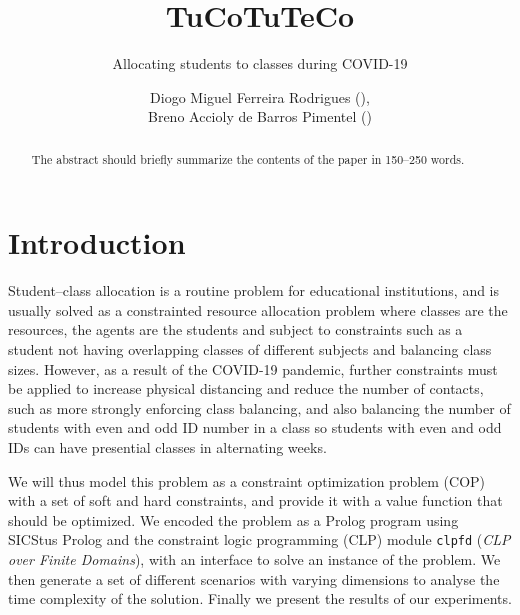\documentclass[runningheads]{llncs}
\begin{document}
\title{TuCoTuTeCo}
\subtitle{Allocating students to classes during COVID-19}
%
%
\author{Diogo Miguel Ferreira Rodrigues (),\\
Breno Accioly de Barros Pimentel ()}


%
\maketitle              %
%
\begin{abstract}
The abstract should briefly summarize the contents of the paper in
150--250 words.

\end{abstract}

\section{Introduction}

Student--class allocation is a routine problem for educational institutions, and is usually solved as a constrainted resource allocation problem where classes are the resources, the agents are the students and subject to constraints such as a student not having overlapping classes of different subjects and balancing class sizes.
However, as a result of the COVID-19 pandemic, further constraints must be applied to increase physical distancing and reduce the number of contacts, such as more strongly enforcing class balancing, and also balancing the number of students with even and odd ID number in a class so students with even and odd IDs can have presential classes in alternating weeks.

We will thus model this problem as a constraint optimization problem (COP) with a set of soft and hard constraints, and provide it with a value function that should be optimized.
We encoded the problem as a Prolog program using SICStus Prolog and the constraint logic programming (CLP) module \texttt{clpfd} (\textit{CLP over Finite Domains}), with an interface to solve an instance of the problem.
We then generate a set of different scenarios with varying dimensions to analyse the time complexity of the solution.
Finally we present the results of our experiments.
\end{document}
